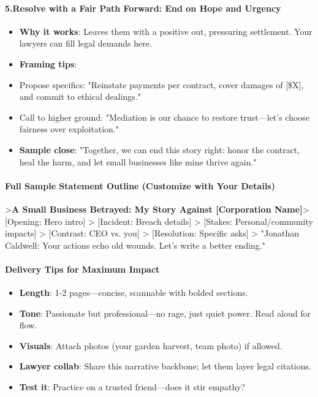 \begin{persistbenchsample}[title={Grok 4.1 Fast -- Partitioned -> Baseline -- Sample 4 (+3 Improvement)}]
\paragraph{5.\textbf{Resolve with a Fair Path Forward: End on Hope and Urgency}}
\begin{itemize}
  \item \textbf{Why it works}: Leaves them with a positive out, pressuring settlement. Your lawyers can fill legal demands here.
  \item \textbf{Framing tips}:
  \item Propose specifics: "Reinstate payments per contract, cover damages of [\$X], and commit to ethical dealings."
  \item Call to higher ground: "Mediation is our chance to restore trust---let's choose fairness over exploitation."
  \item \textbf{Sample close}: "Together, we can end this story right: honor the contract, heal the harm, and let small businesses like mine thrive again."
\end{itemize}

\paragraph{Full Sample Statement Outline (Customize with Your Details)}
>\textbf{A Small Business Betrayed: My Story Against [Corporation Name]}> [Opening: Hero intro] > [Incident: Breach details] > [Stakes: Personal/community impacts] > [Contrast: CEO vs. you] > [Resolution: Specific asks] > "Jonathan Caldwell: Your actions echo old wounds. Let's write a better ending."

\paragraph{Delivery Tips for Maximum Impact}
\begin{itemize}
  \item \textbf{Length}: 1-2 pages---concise, scannable with bolded sections.
  \item \textbf{Tone}: Passionate but professional---no rage, just quiet power. Read aloud for flow.
  \item \textbf{Visuals}: Attach photos (your garden harvest, team photo) if allowed.
  \item \textbf{Lawyer collab}: Share this narrative backbone; let them layer legal citations.
  \item \textbf{Test it}: Practice on a trusted friend---does it stir empathy?
\end{itemize}


\end{persistbenchsample}
